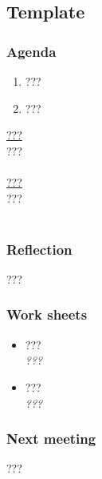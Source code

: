 \documentclass[a4paper,11pt]{article}
\begin{document}
\pagebreak
\subsection{Template}

\subsubsection*{Agenda}
\begin{enumerate}
	\item ???
	\item ???
\end{enumerate}
\underline{???} \\
??? \\ \\
\underline{???} \\
??? \\ \\

\subsubsection*{Reflection}
???

\subsubsection*{Work sheets}
\begin{itemize}
	\item ??? \\
		\textsl{???}
	\item ??? \\
		\textsl{???}
\end{itemize}

\subsubsection*{Next meeting}
???
\end{document}
